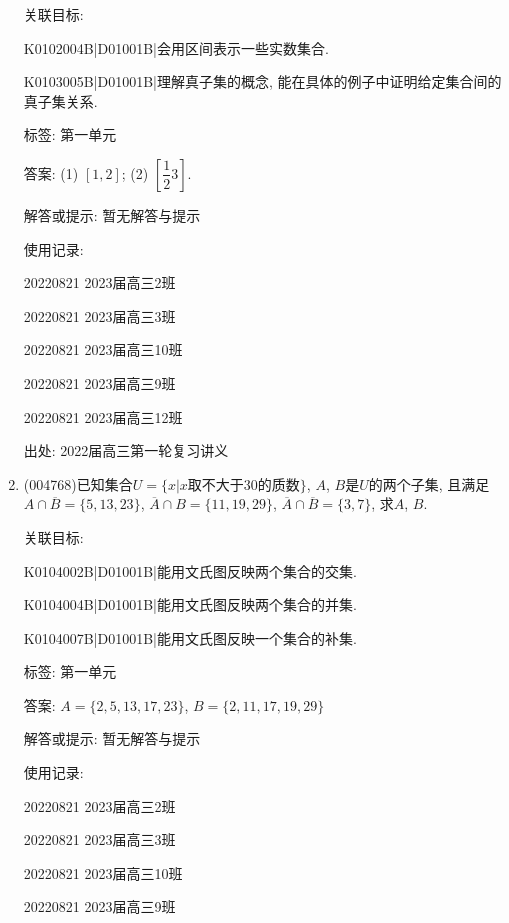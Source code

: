 \documentclass[10pt,a4paper]{article}
\begin{document}
\begin{enumerate}[1.]
关联目标:

K0102004B|D01001B|会用区间表示一些实数集合.

K0103005B|D01001B|理解真子集的概念, 能在具体的例子中证明给定集合间的真子集关系.



标签: 第一单元

答案: (1) $[1,2]$; (2) $[\dfrac 12 3]$.

解答或提示: 暂无解答与提示

使用记录:

20220821	2023届高三2班		

20220821	2023届高三3班		

20220821	2023届高三10班		

20220821	2023届高三9班		

20220821	2023届高三12班	


出处: 2022届高三第一轮复习讲义
\newpage
\item{ (004768)}已知集合$U =\{x|x\text{取不大于}30\text{的质数}\}$, $A$, $B$是$U$的两个子集, 且满足$A\cap \overline B=\{5,13,23\}$, $\overline A\cap B=\{11,19,29\}$, $\overline A\cap \overline B=\{3,7\}$, 求$A$, $B$.


关联目标:

K0104002B|D01001B|能用文氏图反映两个集合的交集.

K0104004B|D01001B|能用文氏图反映两个集合的并集.

K0104007B|D01001B|能用文氏图反映一个集合的补集.



标签: 第一单元

答案: $A=\{2,5,13,17,23\}$, $B=\{2,11,17,19,29\}$

解答或提示: 暂无解答与提示

使用记录:

20220821	2023届高三2班	

20220821	2023届高三3班	

20220821	2023届高三10班	

20220821	2023届高三9班	


\end{enumerate}
\end{document}

